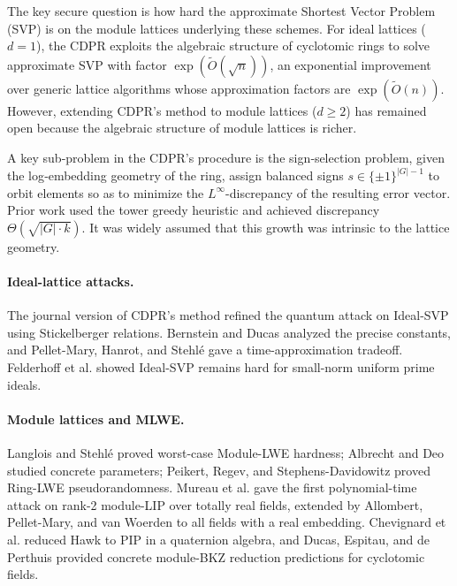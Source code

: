 \documentclass[11pt,a4paper]{article}
\theoremstyle{plain}
\theoremstyle{definition}
\theoremstyle{remark}
\newcommand{\tO}{\tilde{O}}
\begin{document}
The key secure question is how hard the approximate Shortest Vector Problem (SVP) is on the module lattices underlying these schemes. For ideal lattices ($d=1$), the CDPR \cite{CDPR16} exploits the algebraic structure of cyclotomic rings to solve approximate SVP with factor $\exp(\tO(\sqrt{n}))$, an exponential improvement over generic lattice algorithms \cite{LLL82,Schnorr87,GN08,ADRS15} whose approximation factors are $\exp(\tO(n))$. However, extending CDPR's method to module lattices ($d\ge 2$) has remained open because the algebraic structure of module lattices is richer.

A key sub‑problem in the CDPR's procedure is the sign‑selection problem, given the log‑embedding geometry of the ring, assign balanced signs $s\in\{\pm1\}^{|G|-1}$ to orbit elements so as to minimize the $L^\infty$-discrepancy of the resulting error vector. Prior work used the tower greedy heuristic \cite{CDPR16,CDW17} and achieved discrepancy $\Theta(\sqrt{|G|\cdot k})$. It was widely assumed that this growth was intrinsic to the lattice geometry.

\paragraph{Ideal-lattice attacks.} The journal version of CDPR's method \cite{CDW17} refined the quantum attack on Ideal-SVP using Stickelberger relations. Bernstein \cite{Bernstein14} and Ducas \cite{Ducas18} analyzed the precise constants, and Pellet-Mary, Hanrot, and Stehl\'e \cite{PMHS19} gave a time-approximation tradeoff. Felderhoff et al. \cite{FPSW23} showed Ideal-SVP remains hard for small-norm uniform prime ideals.

\paragraph{Module lattices and MLWE.} Langlois and Stehl\'e
\cite{LS15} proved worst-case Module-LWE hardness; Albrecht and Deo \cite{AD17} studied concrete parameters; Peikert, Regev, and Stephens-Davidowitz \cite{PRS17} proved Ring-LWE pseudorandomness. Mureau et al.  \cite{MPPW24} gave the first polynomial-time attack on rank-2 module-LIP over totally real fields, extended by Allombert, Pellet-Mary, and van Woerden \cite{APvW25} to all fields with a real embedding. Chevignard et al. \cite{CMEPW25} reduced Hawk to PIP in a quaternion algebra, and Ducas, Espitau, and de Perthuis \cite{DEP25} provided concrete module-BKZ reduction predictions for cyclotomic fields.
\end{document}
